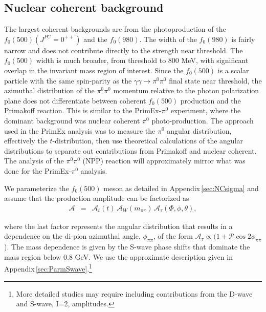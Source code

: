 \subsection{Nuclear coherent background \label{sec:NCback}}
   
The largest coherent backgrounds are  
from the photoproduction of the $f_0(500)(J^{PC}=0^{++})$ and the $f_0(980)$.
The width of the
$f_0(980)$ is fairly narrow and does not contribute directly to the strength
near threshold.
The $f_0(500)$ width is much
broader, from threshold to 800 MeV, with significant overlap in the
invariant mass region of interest.  Since the $f_0(500)$ is a scalar
particle with the same spin-parity as the $\gamma \gamma \rightarrow
\pi^0\pi^0$ final state near threshold, the azimuthal distribution of the
$\pi^0\pi^0$ momentum relative to the
photon polarization plane does not differentiate between coherent
$f_0(500)$ production and the Primakoff reaction.  
This is similar to the PrimEx-$\pi^0$ experiment, where the dominant background
was
nuclear coherent $\pi^0$ photo-production.  The approach used in the
PrimEx analysis was to measure the $\pi^0$ angular distribution,
effectively the $t$-distribution, then use theoretical calculations of
the angular distributions to separate out contributions from Primakoff
and nuclear coherent. The analysis of the $\pi^0\pi^0$ (NPP) reaction
will approximately mirror what was done for the PrimEx-$\pi^0$
analysis.  

We parameterize the $f_{0}(500)$ meson as detailed in
Appendix\,\ref{sec:NCsigma} and assume that the production amplitude
can be factorized as
\begin{eqnarray}
\mathcal{A} & = & \mathcal{A}_t(t) \, \mathcal{A}_W(m_{\pi\pi}) \, \mathcal{A}_\tau(\Phi, \phi, \theta),
\end{eqnarray}

where the last factor represents the angular distribution that results
in a dependence on the di-pion azimuthal angle, $\phi_{\pi\pi}$, of
the form $\mathcal{A}_\tau \propto (1 + \mathcal{P}
\cos{2\phi_{\pi\pi}}$).  The mass dependence is given by the S-wave
phase shifts that dominate the mass region below 0.8 GeV. We use the
approximate description given in
Appendix\,\ref{sec:ParmSwave}.\footnote{More detailed studies may
  require including contributions from the D-wave and S-wave, I=2,
  amplitudes.}

